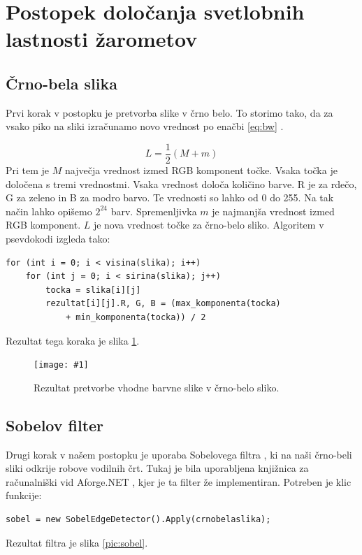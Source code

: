 \documentclass[oneside, a4paper, 12pt]{book}
\newcommand{\slika}[3]{
	\begin{figure}
	\begin{center}
	\texttt{[image: \#1]}
	\end{center}
	\vspace{-20pt}
	\caption{#2}
	\label{#3}
	\end{figure}
}
\begin{document}
\section{Postopek določanja svetlobnih lastnosti žarometov}
\subsection{Črno-bela slika}
Prvi korak v postopku je pretvorba slike v črno belo. To storimo tako, 
da za vsako piko na sliki izračunamo novo vrednost po enačbi \ref{eq:bw} 
\cite{LHS}.

\begin{equation}
L=\dfrac{1}{2}(M+m)
\label{eq:bw}
\end{equation}
Pri tem je $M$ največja vrednost izmed RGB \cite{RGB} komponent točke. 
Vsaka točka je določena s tremi vrednostmi. Vsaka vrednost določa 
količino barve. R je za rdečo, G za zeleno in B za modro barvo. Te 
vrednosti so lahko od 0 do 255. Na tak način lahko opišemo $2^{24}$ 
barv. Spremenljivka $m$ je najmanjša vrednost izmed RGB komponent. 
$L$ je nova vrednost točke za črno-belo sliko. Algoritem v psevdokodi 
izgleda tako:
\begin{samepage}
\begin{verbatim}
for (int i = 0; i < visina(slika); i++)
    for (int j = 0; i < sirina(slika); j++)
	    tocka = slika[i][j]
	    rezultat[i][j].R, G, B = (max_komponenta(tocka) 
	        + min_komponenta(tocka)) / 2
\end{verbatim}
\end{samepage}
Rezultat tega koraka je slika \ref{pic:bw}.



\slika{slike/crno-bela-slika.jpg}{Rezultat pretvorbe vhodne barvne 
slike v črno-belo sliko.}{pic:bw}

\subsection{Sobelov filter}
\label{ch:sobel}
Drugi korak v našem postopku je uporaba Sobelovega filtra 
\cite{sobel-wiki}, ki na naši črno-beli sliki odkrije robove 
vodilnih črt. Tukaj je bila uporabljena knjižnica za računalniški 
vid Aforge.NET \cite{sobel}, kjer je ta filter že implementiran. Potreben 
je klic funkcije:
\begin{samepage}
\begin{verbatim}
sobel = new SobelEdgeDetector().Apply(crnobelaslika);
\end{verbatim}
\end{samepage}
Rezultat filtra je slika \ref{pic:sobel}.
\end{document}

